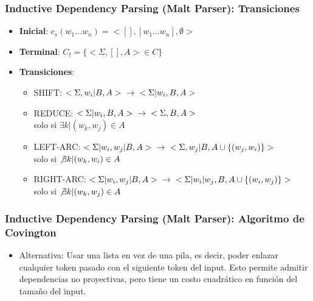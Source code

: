 \documentclass[spanish]{beamer}
\begin{document}
\begin{frame}
\frametitle{Inductive Dependency Parsing (Malt Parser): Transiciones}
\begin{itemize}
\item \textbf{Inicial}: $c_s(w_1\dots w_n) = <[], [w_1\dots w_n],\emptyset>$
\item \textbf{Terminal}: $C_t = \{<\Sigma,[],A>\in C\}$
\item \textbf{Transiciones}:   
    \begin{itemize}
    \item SHIFT:      $<\Sigma,w_i|B,A> \hspace{0.2cm} \rightarrow \hspace{0.2cm} <\Sigma|w_i,B,A>$
    \item REDUCE:     $<\Sigma|w_i,B,A> \hspace{0.2cm} \rightarrow \hspace{0.2cm} <\Sigma,B,A >$ \\
solo si $\exists k | (w_k,w_j)\in A$ 
    \item LEFT-ARC:   $<\Sigma|w_i,w_j|B,A> \hspace{0.2cm} \rightarrow \hspace{0.2cm} <\Sigma,w_j|B,A\cup \{(w_j,w_i)\}>$ \\
solo si $\not\exists k | (w_k,w_i)\in A$
    \item RIGHT-ARC: $<\Sigma|w_i,w_j|B,A> \hspace{0.2cm}\rightarrow \hspace{0.2cm} 
<\Sigma|w_i|w_j,B,A\cup \{(w_i,w_j)\}>$ \\ 
solo si $\not\exists k | (w_k,w_j)\in A$
    \end{itemize}
\end{itemize}
\end{frame}

\begin{frame}
\frametitle{Inductive Dependency Parsing (Malt Parser): Algoritmo de Covington}
\begin{itemize}
\item Alternativa: Usar una lista en vez de una pila, es decir, poder enlazar cualquier token pasado con el siguiente token del input. Esto permite admitir dependencias no proyectivas, pero tiene un costo cuadrático en función del tamaño del input.
\end{itemize}
\end{frame}
\end{document}
